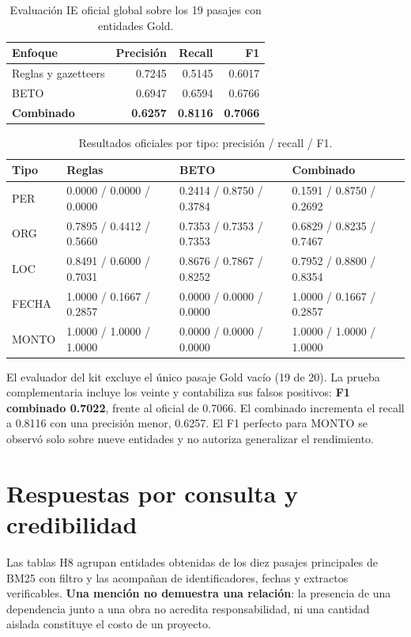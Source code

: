 \documentclass[10pt,a4paper]{article}
\newcommand{\tabfont}{\fontsize{9.1}{11.4}\selectfont}
\newcommand{\tinyfont}{\fontsize{8.8}{11.4}\selectfont}
\begin{document}
\begin{table}[H]
\centering\tabfont
\caption{Evaluación IE oficial global sobre los 19 pasajes con entidades Gold.}
\begin{tabularx}{\linewidth}{@{}Xrrr@{}}
\toprule
\textbf{Enfoque} & \textbf{Precisión} & \textbf{Recall} & \textbf{F1}\\
\midrule
Reglas y gazetteers & 0.7245 & 0.5145 & 0.6017\\
BETO & 0.6947 & 0.6594 & 0.6766\\
\rowcolor{pale} \textbf{Combinado} & \textbf{0.6257} & \textbf{0.8116} & \textbf{0.7066}\\
\bottomrule
\end{tabularx}
\end{table}
\begin{table}[H]
\centering\tinyfont
\caption{Resultados oficiales por tipo: precisión / recall / F1.}
\begin{tabularx}{\linewidth}{@{}lXXX@{}}
\toprule
\textbf{Tipo} & \textbf{Reglas} & \textbf{BETO} & \textbf{Combinado}\\
\midrule
PER & 0.0000 / 0.0000 / 0.0000 & 0.2414 / 0.8750 / 0.3784 & 0.1591 / 0.8750 / 0.2692\\
ORG & 0.7895 / 0.4412 / 0.5660 & 0.7353 / 0.7353 / 0.7353 & 0.6829 / 0.8235 / 0.7467\\
LOC & 0.8491 / 0.6000 / 0.7031 & 0.8676 / 0.7867 / 0.8252 & 0.7952 / 0.8800 / 0.8354\\
FECHA & 1.0000 / 0.1667 / 0.2857 & 0.0000 / 0.0000 / 0.0000 & 1.0000 / 0.1667 / 0.2857\\
MONTO & 1.0000 / 1.0000 / 1.0000 & 0.0000 / 0.0000 / 0.0000 & 1.0000 / 1.0000 / 1.0000\\
\bottomrule
\end{tabularx}
\end{table}
El evaluador del kit excluye el único pasaje Gold vacío (19 de 20). La prueba complementaria incluye los veinte y contabiliza sus falsos positivos: \textbf{F1 combinado 0.7022}, frente al oficial de 0.7066. El combinado incrementa el recall a 0.8116 con una precisión menor, 0.6257. El F1 perfecto para MONTO se observó solo sobre nueve entidades y no autoriza generalizar el rendimiento.


\section{Respuestas por consulta y credibilidad}
Las tablas H8 agrupan entidades obtenidas de los diez pasajes principales de BM25 con filtro y las acompañan de identificadores, fechas y extractos verificables. \textbf{Una mención no demuestra una relación}: la presencia de una dependencia junto a una obra no acredita responsabilidad, ni una cantidad aislada constituye el costo de un proyecto.
\end{document}
